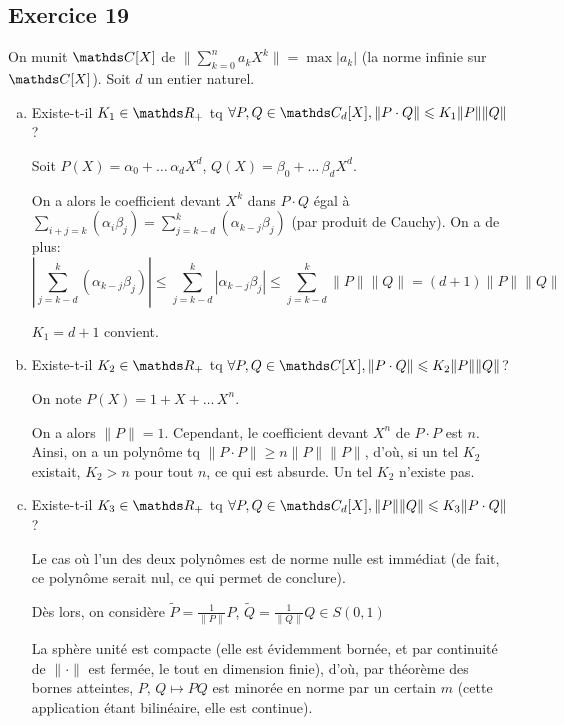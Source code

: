 \documentclass[a4paper, 12pt]{article}
\begin{document}
	\subsection*{Exercice 19}
	On munit $\C[X]$ de $\| \displaystyle \sum_{k=0}^n a_k X^k \| = \max|a_k|$ (la norme infinie sur $\C[X]$).	Soit $d$ un entier naturel.
	\begin{enumerate}[a)]
		\item Existe-t-il $K_1 \in \R_+$ tq $\forall P, Q \in \C_d[X], \|P\cdot Q\| \leqslant K_1 \|P\|\|Q\|$?
		\begin{corr}
			Soit $P(X) = \alpha_0 + \dots\, \alpha_d X^d$, $Q(X) = \beta_0 + \dots\, \beta_d X^d$.
			
			On a alors le coefficient devant $X^k$ dans $P\cdot Q$ égal à $\displaystyle \sum_{i+j=k} (\alpha_i  \beta_j) = \sum_{j=k-d}^k (\alpha_{k-j} \beta_j)$ (par produit de Cauchy). On a de plus:
			$$ \left| \sum_{j=k-d}^k (\alpha_{k-j} \beta_j) \right| \leqslant \sum_{j=k-d}^k |\alpha_{k-j} \beta_j| \leqslant \sum_{j=k-d}^k \|P\| \|Q\| = (d+1) \|P\|\|Q\|$$
			
			$K_1 = d+1$ convient.
		\end{corr}
		
		\item Existe-t-il $K_2 \in \R_+$ tq $\forall P, Q \in \C[X], \|P\cdot Q\| \leqslant  K_2 \|P\|\|Q\|$?
		\begin{corr}
			On note $P(X) = 1 + X + \dots \, X^n $.
			
			On a alors $\|P\| = 1$. Cependant, le coefficient devant $X^n$ de $P\cdot P$ est $n$. Ainsi, on a un polynôme tq $\|P\cdot P\| \geqslant n \|P\|\|P\|$, d'où, si un tel $K_2$ existait, $K_2 > n$ pour tout $n$, ce qui est absurde. Un tel $K_2$ n'existe pas.
		\end{corr}
		
		\item Existe-t-il $K_3 \in \R_+$ tq $\forall P, Q \in \C_d[X], \|P\|\|Q\| \leqslant  K_3\|P\cdot Q\|$?
		\begin{corr}
			Le cas où l'un des deux polynômes est de norme nulle est immédiat (de fait, ce polynôme serait nul, ce qui permet de conclure).
			
			Dès lors, on considère $\tilde P = \frac 1 {\|P\|} P$, $\tilde Q = \frac 1 {\|Q\|} Q \in S(0, 1)$
			
			La sphère unité est compacte (elle est évidemment bornée, et par continuité de $\|\cdot \|$ est fermée, le tout en dimension finie), d'où, par théorème des bornes atteintes, $P,\, Q \mapsto PQ$ est minorée en norme par un certain $m$ (cette application étant bilinéaire, elle est continue).
			

\end{corr}
\end{enumerate}
\end{document}
